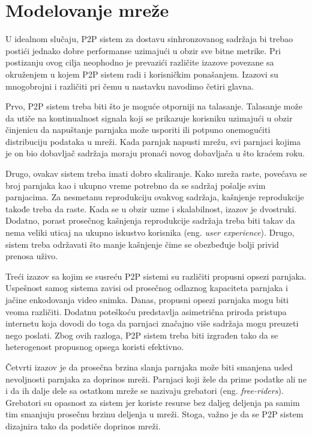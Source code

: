 \documentclass[12pt,oneside]{memoir}
\begin{document}
\section{Modelovanje mreže}
\label{P2P.5}

U idealnom slučaju, P2P sistem za dostavu sinhronzovanog sadržaja bi trebao postići jednako dobre performanse uzimajući u obzir sve bitne metrike. Pri postizanju ovog cilja neophodno je prevazići različite izazove povezane sa okruženjem u kojem P2P sistem radi i korisničkim ponašanjem. Izazovi su mnogobrojni i različiti pri čemu u nastavku navodimo četiri glavna.

Prvo, P2P sistem treba biti što je moguće otporniji na talasanje. Talasanje može da utiče na kontinualnost signala koji se prikazuje korisniku uzimajući u obzir činjenicu da napuštanje parnjaka može usporiti ili potpuno onemogućiti distribuciju podataka u mreži.
Kada parnjak napusti mrežu, svi parnjaci kojima je on bio dobavljač sadržaja moraju pronaći novog dobavljača u što kraćem roku. 

Drugo, ovakav sistem treba imati dobro skaliranje. Kako mreža raste, povećava se broj parnjaka kao i ukupno vreme potrebno da se sadržaj pošalje svim parnjacima. Za nesmetanu reprodukciju ovakvog sadržaja, kašnjenje reprodukcije takođe treba da raste. Kada se u obzir uzme i skalabilnost, izazov je dvostruki. Dodatno, porast prosečnog kašnjenja reprodukcije sadržaja treba biti takav da nema veliki uticaj na ukupno iskustvo korisnika (eng. \textit{user experience}). Drugo, sistem treba održavati što manje kašnjenje čime se obezbeđuje bolji privid prenosa uživo.

Treći izazov sa kojim se susreću P2P sistemi su različiti propusni opsezi parnjaka. Uspešnost samog sistema zavisi od prosečnog odlaznog kapaciteta parnjaka i jačine enkodovanja video snimka. Danas, propusni opsezi parnjaka mogu biti veoma različiti. Dodatnu poteškoću predstavlja asimetrična priroda pristupa internetu koja dovodi do toga da parnjaci značajno više sadržaja mogu preuzeti nego poslati. Zbog ovih razloga, P2P sistem treba biti izgrađen tako da se heterogenost propusnog opsega koristi efektivno.

Četvrti izazov je da prosečna brzina slanja parnjaka može biti smanjena usled nevoljnosti parnjaka za doprinos mreži. Parnjaci koji žele da prime podatke ali ne i da ih dalje dele sa ostatkom mreže se nazivaju grebatori (eng. \textit{free-riders}). Grebatori su opasnost za sistem jer koriste resurse bez daljeg deljenja pa samim tim smanjuju prosečnu brzinu deljenja u mreži. Stoga, važno je da se P2P sistem dizajnira tako da podstiče doprinos mreži.
\end{document}
